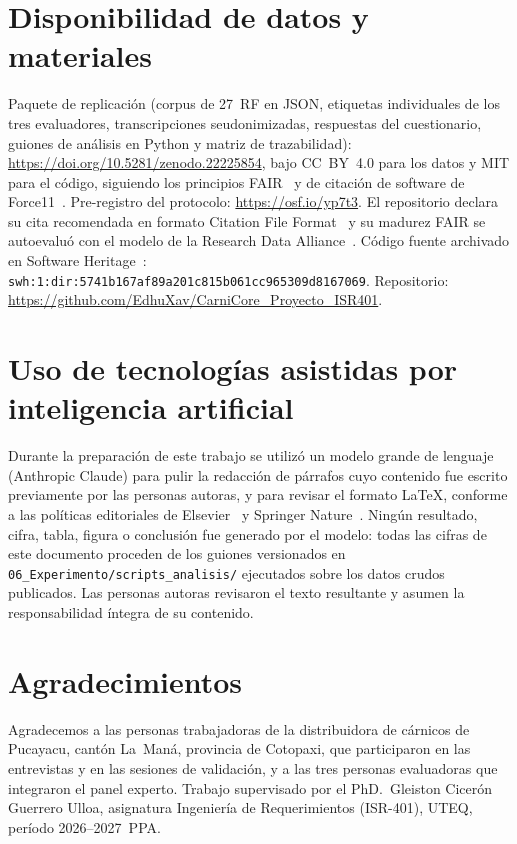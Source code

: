 \documentclass[runningheads]{llncs}
\begin{document}
\section*{Disponibilidad de datos y materiales}

Paquete de replicación (corpus de 27~RF en JSON, etiquetas individuales de los
tres evaluadores, transcripciones seudonimizadas, respuestas del cuestionario,
guiones de análisis en Python y matriz de trazabilidad):
\url{https://doi.org/10.5281/zenodo.22225854}, bajo CC~BY~4.0 para los datos y
MIT para el código, siguiendo los principios FAIR~\cite{wilkinson2016fair} y de
citación de software de Force11~\cite{smith2016software}.
Pre-registro del protocolo: \url{https://osf.io/yp7t3}.
El repositorio declara su cita recomendada en formato Citation File
Format~\cite{druskat2021cff} y su madurez FAIR se autoevaluó con el modelo de
la Research Data Alliance~\cite{rda2020fair}. Código fuente archivado en
Software Heritage~\cite{dicosmo2020referencing,dicosmo2017swh}:
\texttt{swh:1:dir:5741b167af89a201c815b061cc965309d8167069}.
Repositorio: \url{https://github.com/EdhuXav/CarniCore_Proyecto_ISR401}.

\section*{Uso de tecnologías asistidas por inteligencia artificial}

Durante la preparación de este trabajo se utilizó un modelo grande de lenguaje
(Anthropic Claude) para pulir la redacción de párrafos cuyo contenido fue
escrito previamente por las personas autoras, y para revisar el formato
\LaTeX{}, conforme a las políticas editoriales de
Elsevier~\cite{elsevier2023ai} y Springer Nature~\cite{springer2023ai}. Ningún
resultado, cifra, tabla, figura o conclusión fue generado por el modelo: todas
las cifras de este documento proceden de los guiones versionados en
\texttt{06\_Experimento/scripts\_analisis/} ejecutados sobre los datos crudos
publicados. Las personas autoras revisaron el texto resultante y asumen la
responsabilidad íntegra de su contenido.

\section*{Agradecimientos}

Agradecemos a las personas trabajadoras de la distribuidora de cárnicos de
Pucayacu, cantón La~Man\'{a}, provincia de Cotopaxi, que participaron en las
entrevistas y en las sesiones de validación, y a las tres personas evaluadoras
que integraron el panel experto. Trabajo supervisado por el PhD.\ Gleiston
Cicer\'{o}n Guerrero Ulloa, asignatura Ingeniería de Requerimientos (ISR-401),
UTEQ, período 2026--2027~PPA.



\end{document}

